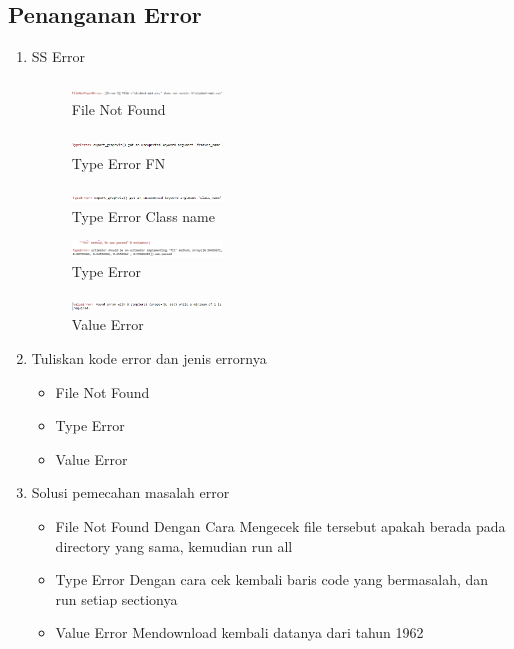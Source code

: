 \subsection{Penanganan Error}
\begin{enumerate}
	\item SS Error
	\hfill\break
	\begin{figure}[H]
		\includegraphics[width=4cm]{figures/1174027/error/2_file_not_found.png}
		\centering
		\caption{File Not Found}
	\end{figure}
	\begin{figure}[H]
		\includegraphics[width=4cm]{figures/1174027/error/2_type.png}
		\centering
		\caption{Type Error FN}
	\end{figure}
	\begin{figure}[H]
		\includegraphics[width=4cm]{figures/1174027/error/2_type2.png}
		\centering
		\caption{Type Error Class name}
	\end{figure}
	\begin{figure}[H]
		\includegraphics[width=4cm]{figures/1174027/error/2_type3.png}
		\centering
		\caption{Type Error}
	\end{figure}
	\begin{figure}[H]
		\includegraphics[width=4cm]{figures/1174027/error/2_value.png}
		\centering
		\caption{Value Error}
	\end{figure}
	\item Tuliskan kode error dan jenis errornya
	\hfill\break
	\begin{itemize}
		\item File Not Found
		\item Type Error
		\item Value Error
	\end{itemize}
	\item Solusi pemecahan masalah error
	\hfill\break
	\begin{itemize}
		\item File Not Found
		\hfill\break
		Dengan Cara Mengecek file tersebut apakah berada pada directory yang sama, kemudian run all
		\item Type Error
		\hfill\break
		Dengan cara cek kembali baris code yang bermasalah, dan run setiap sectionya
		\item Value Error
		\hfill\break
		Mendownload kembali datanya dari tahun 1962
	\end{itemize}
\end{enumerate}

